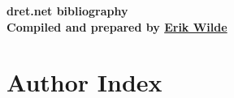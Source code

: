 \documentclass[10pt]{article}
\def\doctitle{dret.net bibliography}
\def\docauthor{Erik Wilde}
\begin{document}
\begin{centering}
\vspace*{7mm}
{\huge\bf\doctitle}\\
\vspace*{7mm}
{\large\bf Compiled and prepared by \href{http://dret.net/netdret/}{\docauthor}}\\
\vspace*{10mm}
\end{centering}

\nocite{*}

\def\authorstyle#1{{\sc #1}}




\renewcommand{\aipages}[1]{[{#1}]}
\section*{Author Index}

\begin{multicols}{2}
\printauthorindex
\end{multicols}
\end{document}
